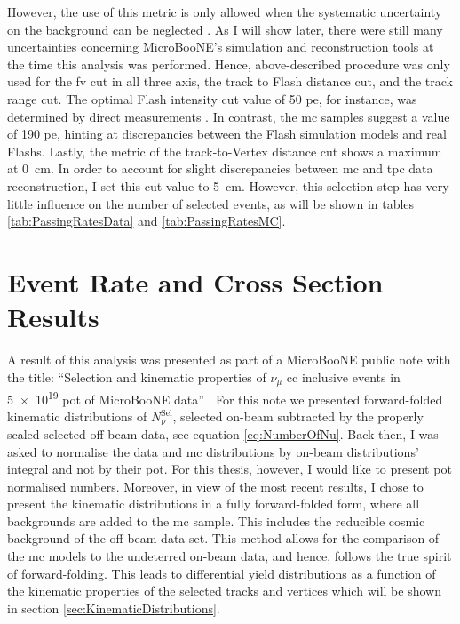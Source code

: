 However, the use of this metric is only allowed when the systematic uncertainty on the background can be neglected \cite{ProgressInNuMeasurements}. As I will show later, there were still many uncertainties concerning MicroBooNE's simulation and reconstruction tools at the time this analysis was performed. Hence, above-described procedure was only used for the \gls{fv} cut in all three axis, the track to \gls{Flash} distance cut, and the track range cut. The optimal \gls{Flash} intensity cut value of \num{50} \gls{pe}, for instance, was determined by direct measurements \cite{MicroBooNEFirstNuPN}. In contrast, the \gls{mc} samples suggest a value of \num{190} \gls{pe}, hinting at discrepancies between the \gls{Flash} simulation models and real \glspl{Flash}. Lastly, the metric of the track-to-\gls{Vertex} distance cut shows a maximum at \SI{0}{\centi\metre}. In order to account for slight discrepancies between \gls{mc} and \gls{tpc} data reconstruction, I set this cut value to \SI{5}{\centi\metre}. However, this selection step has very little influence on the number of selected events, as will be shown in tables \ref{tab:PassingRatesData} and \ref{tab:PassingRatesMC}.

\section{Event Rate and Cross Section Results} \label{sec:CrossSectionResults}
A result of this analysis was presented as part of a MicroBooNE public note with the title: ``Selection and kinematic properties of $\nu_\mu$ \gls{cc} inclusive events in \num{5e19} \gls{pot} of MicroBooNE data'' \cite{MicroBooNECCInclPN}. For this note we presented forward-folded kinematic distributions of $N^\text{Sel}_\nu$, \ie selected on-beam subtracted by the properly scaled selected off-beam data, see equation \ref{eq:NumberOfNu}. Back then, I was asked to normalise the data and \gls{mc} distributions by on-beam distributions' integral and not by their \gls{pot}. For this thesis, however, I would like to present \gls{pot} normalised numbers. Moreover, in view of the most recent results, I chose to present the kinematic distributions in a fully forward-folded form, where all backgrounds are added to the \gls{mc} sample. This includes the reducible cosmic background of the off-beam data set. This method allows for the comparison of the \gls{mc} models to the undeterred on-beam data, and hence, follows the true spirit of forward-folding. This leads to differential yield distributions as a function of the kinematic properties of the selected tracks and vertices which will be shown in section \ref{sec:KinematicDistributions}.

